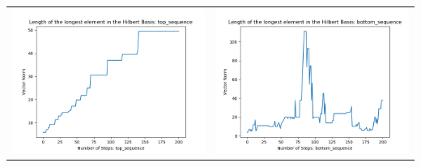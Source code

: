 \documentclass[10pt]{article}
\begin{document}
\begin{tabular}{c|c}
\begin{minipage}{.4\textwidth}
\includegraphics[width=\textwidth]{"DATA/5d/5 generators 2 bound E/top_sequence LENGTH"}
\end{minipage} &
\begin{minipage}{.4\textwidth}
\includegraphics[width=\textwidth]{"DATA/5d/5 generators 2 bound E bottomup/bottom_sequence LENGTH"}
\end{minipage}
\end{tabular}
\end{document}
